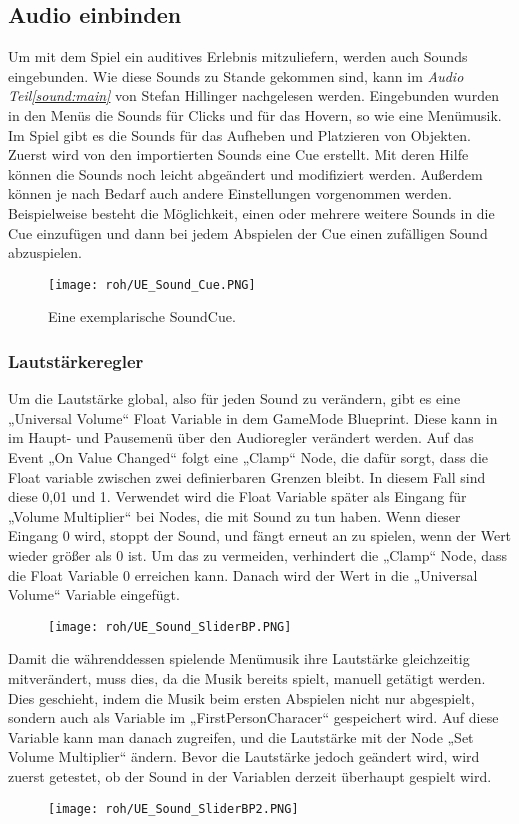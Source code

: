 \subsection{Audio einbinden}
\label{UE:AudioEinbinden}
Um mit dem Spiel ein auditives Erlebnis mitzuliefern, werden auch Sounds eingebunden. Wie diese Sounds zu Stande gekommen sind, kann im \textit{Audio Teil\ref{sound:main}} von Stefan Hillinger nachgelesen werden.
Eingebunden wurden in den Menüs die Sounds für Clicks und für das Hovern, so wie eine Menümusik. Im Spiel gibt es die Sounds für das Aufheben und Platzieren von Objekten.
Zuerst wird von den importierten Sounds eine Cue erstellt. Mit deren Hilfe können die Sounds noch leicht abgeändert und modifiziert werden. Außerdem können je nach Bedarf auch andere Einstellungen vorgenommen werden. Beispielweise besteht die Möglichkeit, einen oder mehrere weitere Sounds in die Cue einzufügen und dann bei jedem Abspielen der Cue einen zufälligen Sound abzuspielen.
\begin{figure}[H]
    \centering
    \texttt{[image: roh/UE\_Sound\_Cue.PNG]}
    \caption{Eine exemplarische SoundCue.}
    \label{UE:Sound_Cue}
\end{figure}
\subsubsection{Lautstärkeregler}
Um die Lautstärke global, also für jeden Sound zu verändern, gibt es eine „Universal Volume“ Float Variable in dem GameMode Blueprint. Diese kann in im Haupt- und Pausemenü über den Audioregler verändert werden. Auf das Event „On Value Changed“ folgt eine „Clamp“ Node, die dafür sorgt, dass die Float variable zwischen zwei definierbaren Grenzen bleibt. In diesem Fall sind diese 0,01 und 1.
Verwendet wird die Float Variable später als Eingang für „Volume Multiplier“ bei Nodes, die mit Sound zu tun haben. Wenn dieser Eingang 0 wird, stoppt der Sound, und fängt erneut an zu spielen, wenn der Wert wieder größer als 0 ist. Um das zu vermeiden, verhindert die „Clamp“ Node, dass die Float Variable 0 erreichen kann. Danach wird der Wert in die „Universal Volume“ Variable eingefügt.
\begin{figure}[H]
    \centering
    \texttt{[image: roh/UE\_Sound\_SliderBP.PNG]}
    \label{UE:Sound_SliderBP}
\end{figure}
Damit die währenddessen spielende Menümusik ihre Lautstärke gleichzeitig mitverändert, muss dies, da die Musik bereits spielt, manuell getätigt werden.
Dies geschieht, indem die Musik beim ersten Abspielen nicht nur abgespielt, sondern auch als Variable im „FirstPersonCharacer“ gespeichert wird. Auf diese Variable kann man danach zugreifen, und die Lautstärke mit der Node „Set Volume Multiplier“ ändern. Bevor die Lautstärke jedoch geändert wird, wird zuerst getestet, ob der Sound in der Variablen derzeit überhaupt gespielt wird.
\begin{figure}[H]
    \centering
    \texttt{[image: roh/UE\_Sound\_SliderBP2.PNG]}
    \label{UE:Sound_SliderBP2}
\end{figure}
